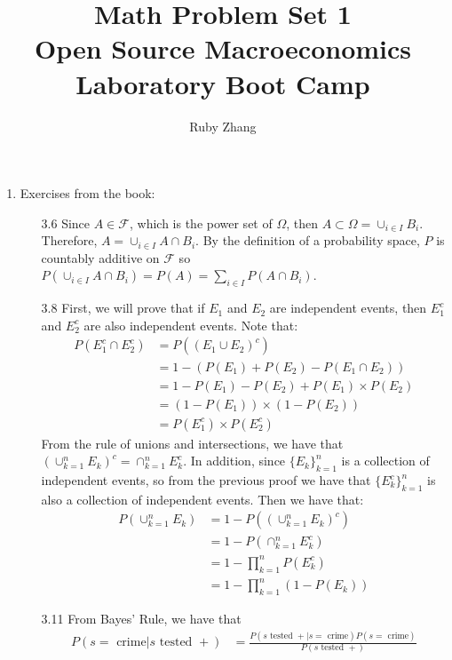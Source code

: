 \documentclass[letterpaper,12pt]{article}
\theoremstyle{definition}
\begin{document}
\title{Math Problem Set 1 \\
Open Source Macroeconomics Laboratory Boot Camp}
\author{Ruby Zhang}
\maketitle

\begin{enumerate}
  \item Exercises from the book:
    \begin{enumerate}
    \item[3.6]
    Since $A \in \mathscr{F}$, which is the power set of $\Omega$, then $A \subset \Omega = \cup_{i \in I} B_i$. Therefore, $A = \cup_{i \in I} A \cap B_i$. By the definition of a probability space, $P$ is countably additive on $\mathscr{F}$ so $P(\cup_{i \in I} A \cap B_i) = P(A) = \sum_{i \in I} P(A \cap B_i)$.
    \item[3.8]
    First, we will prove that if $E_1$ and $E_2$ are independent events, then $E_1^c$ and $E_2^c$ are also independent events. Note that:
      \begin{align*}
        P(E_1^c \cap E_2^c) &= P((E_1 \cup E_2)^c) \\
        & = 1 - (P(E_1) + P(E_2) - P(E_1 \cap E_2)) \\
        &= 1 - P(E_1) - P(E_2) + P(E_1) \times P(E_2) \\
        & = (1 - P(E_1))\times(1-P(E_2)) \\
        & = P(E_1^c) \times P(E_2^c)
      \end{align*}
    From the rule of unions and intersections, we have that $(\cup_{k=1}^n E_k)^c = \cap_{k=1}^n E_k^c$. In addition, since $\{E_k\}_{k=1}^n$ is a collection of independent events, so from the previous proof we have that $\{E_k^c\}_{k=1}^n$ is also a collection of independent events. Then we have that:
      \begin{align*}
        P(\cup_{k=1}^n E_k) &= 1 - P((\cup_{k=1}^n E_k)^c) \\
        &= 1 - P(\cap_{k=1}^n E_k^c) \\
        &= 1 - \prod_{k=1}^n P(E_k^c) \\
        &= 1 - \prod_{k=1}^n (1 - P(E_k))
      \end{align*}
    \item[3.11]
      From Bayes' Rule, we have that
      \begin{align*}
        P(s=\text{ crime}|s\text{ tested }+) &= \frac{P(s\text{ tested }+|s=\text{ crime})P(s=\text{ crime})}{P(s\text{ tested }+)} \\

\end{align*}
\end{enumerate}
\end{enumerate}
\end{document}
